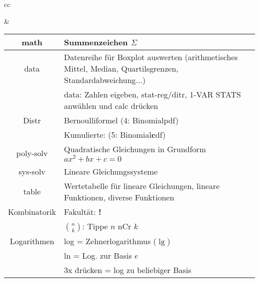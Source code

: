 \begin{tabular}{cc}


&

\begin{tabular}{c|p{10cm}}\hline
\cellcolor[HTML]{8888ee}math         & \cellcolor[HTML]{8888ee} Summenzeichen $\Sigma$ \\\hline
\cellcolor[HTML]{88ee88}data         & \cellcolor[HTML]{88ee88} Datenreihe für Boxplot auswerten (arithmetisches Mittel, Median, Quartilsgrenzen, Standardabweichung...)\\
\cellcolor[HTML]{88ee88}             & \cellcolor[HTML]{88ee88} data: Zahlen eigeben, stat-reg/ditr, 1-VAR STATS anwählen und calc drücken\\
\cellcolor[HTML]{88ee88}Distr        & \cellcolor[HTML]{88ee88} Bernoulliformel (4: Binomialpdf)\\
\cellcolor[HTML]{88ee88}             & \cellcolor[HTML]{88ee88} Kumulierte: (5: Binomial\textbf{c}df)\\\hline
\cellcolor[HTML]{eeee88}poly-solv    & \cellcolor[HTML]{eeee88} Quadratische Gleichungen in Grundform $ax^2+bx+c=0$\\\hline
\cellcolor[HTML]{eebb88}sys-solv     & \cellcolor[HTML]{eebb88} Lineare Gleichungssysteme\\\hline
\cellcolor[HTML]{bb88ff}table        & \cellcolor[HTML]{bb88ff} Wertetabelle für lineare Gleichungen, lineare Funktionen, diverse Funktionen\\\hline
\cellcolor[HTML]{ddaa88}Kombinatorik & \cellcolor[HTML]{ddaa88} Fakultät: {\color{red}\textbf{!}}\\
\cellcolor[HTML]{ddaa88}             & \cellcolor[HTML]{ddaa88} $n \choose k$: Tippe $n$ nCr $k$\\\hline
\cellcolor[HTML]{bbaa88}Logarithmen  & \cellcolor[HTML]{bbaa88} log = Zehnerlogarithmus ($\lg$)\\
\cellcolor[HTML]{bbaa88}             & \cellcolor[HTML]{bbaa88} ln  = Log. zur Basis $e$\\
\cellcolor[HTML]{bbaa88}             & \cellcolor[HTML]{bbaa88} 3x drücken = log zu beliebiger Basis\\\hline
\end{tabular}\\
\end{tabular}






